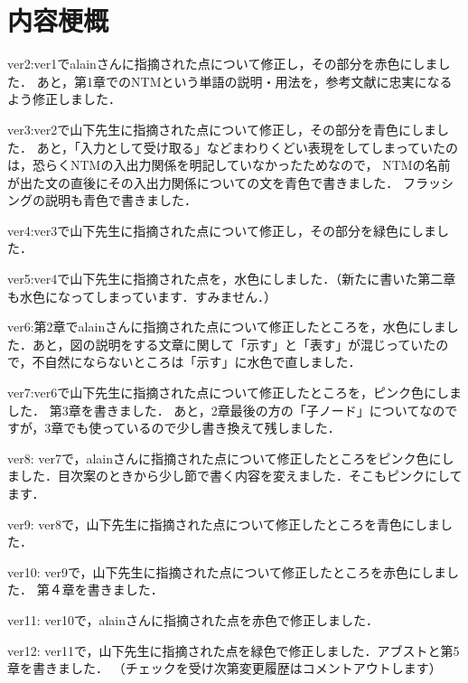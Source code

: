 \chapter*{内容梗概}
ver2:ver1でalainさんに指摘された点について修正し，その部分を赤色にしました．
あと，第1章でのNTMという単語の説明・用法を，参考文献に忠実になるよう修正しました．

ver3:ver2で山下先生に指摘された点について修正し，その部分を青色にしました．
あと，「入力として受け取る」などまわりくどい表現をしてしまっていたのは，恐らくNTMの入出力関係を明記していなかったためなので，
NTMの名前が出た文の直後にその入出力関係についての文を青色で書きました．
フラッシングの説明も青色で書きました．

ver4:ver3で山下先生に指摘された点について修正し，その部分を緑色にしました．

ver5:ver4で山下先生に指摘された点を，水色にしました．（新たに書いた第二章も水色になってしまっています．すみません．）

ver6:第2章でalainさんに指摘された点について修正したところを，水色にしました．あと，図の説明をする文章に関して「示す」と「表す」が混じっていたので，不自然にならないところは「示す」に水色で直しました．

ver7:ver6で山下先生に指摘された点について修正したところを，ピンク色にしました．
第3章を書きました．
あと，2章最後の方の「子ノード」についてなのですが，3章でも使っているので少し書き換えて残しました．

ver8:
ver7で，alainさんに指摘された点について修正したところをピンク色にしました．目次案のときから少し節で書く内容を変えました．そこもピンクにしてます．

ver9:
ver8で，山下先生に指摘された点について修正したところを青色にしました．

ver10: 
ver9で，山下先生に指摘された点について修正したところを赤色にしました．
第４章を書きました．

ver11: 
ver10で，alainさんに指摘された点を赤色で修正しました．

ver12: 
ver11で，山下先生に指摘された点を緑色で修正しました．アブストと第5章を書きました．
（チェックを受け次第変更履歴はコメントアウトします）


